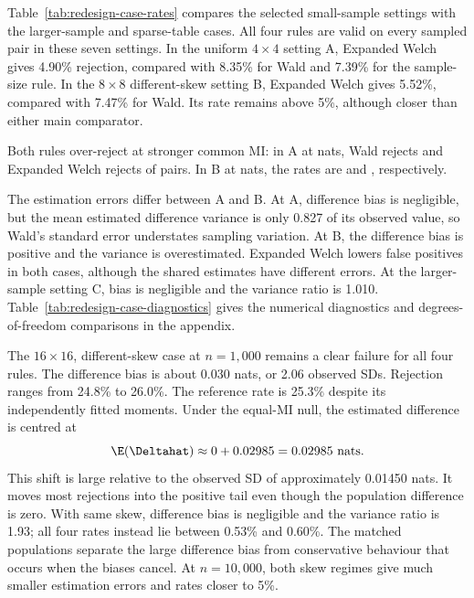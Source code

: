 Table~\ref{tab:redesign-case-rates} compares the selected small-sample
settings with the larger-sample and sparse-table cases. All four rules
are valid on every sampled pair in these seven settings. In the uniform
\(4\times4\) setting A, Expanded Welch gives 4.90\% rejection, compared
with 8.35\% for Wald and 7.39\% for the sample-size rule. In the
\(8\times8\) different-skew setting B, Expanded Welch gives 5.52\%,
compared with 7.47\% for Wald. Its rate remains above 5\%, although
closer than either main comparator.

Both rules over-reject at stronger common MI: in A at
\RedesignUpperAMI{} nats, Wald rejects \RedesignUpperAWaldRate{} and
Expanded Welch rejects \RedesignUpperAExpandedRate{} of pairs.
In B at \RedesignUpperBMI{} nats, the rates are
\RedesignUpperBWaldRate{} and \RedesignUpperBExpandedRate{}, respectively.

\begin{table}[!htbp]
\centering
\small
\setlength{\tabcolsep}{4pt}
\caption{Null rejection rates with pointwise 95\% intervals.}
\label{tab:redesign-case-rates}

\end{table}

The estimation errors differ between A and B. At A, difference bias is
negligible, but the mean estimated difference variance is only 0.827 of
its observed value, so Wald's standard error understates sampling
variation. At B, the difference bias is positive and the variance is
overestimated. Expanded Welch lowers false positives in both cases,
although the shared estimates have different errors. At the larger-sample
setting C, bias is negligible and the variance ratio is 1.010.
Table~\ref{tab:redesign-case-diagnostics} gives the numerical diagnostics
and degrees-of-freedom comparisons in the appendix.

The \(16\times16\), different-skew case at \(n=1{,}000\) remains a
clear failure for all four rules. The difference bias is about 0.030 nats,
or 2.06 observed SDs. Rejection ranges from 24.8\% to 26.0\%.
The reference rate is 25.3\% despite its independently fitted moments.
Under the equal-MI null, the estimated difference is centred at
\begin{equation}
 \E(\Deltahat)\approx 0+0.02985=0.02985\text{ nats}.
 \label{eq:redesign-null-bias-shift}
\end{equation}
This shift is large relative to the observed SD of approximately 0.01450
nats. It moves most rejections into the positive tail even though the
population difference is zero.
With same skew, difference bias is negligible and the variance ratio is
1.93; all four rates instead lie between 0.53\% and 0.60\%.
The matched populations separate the large difference bias from
conservative behaviour that occurs when the biases cancel. At
\(n=10{,}000\), both skew regimes give much smaller estimation errors
and rates closer to 5\%.

